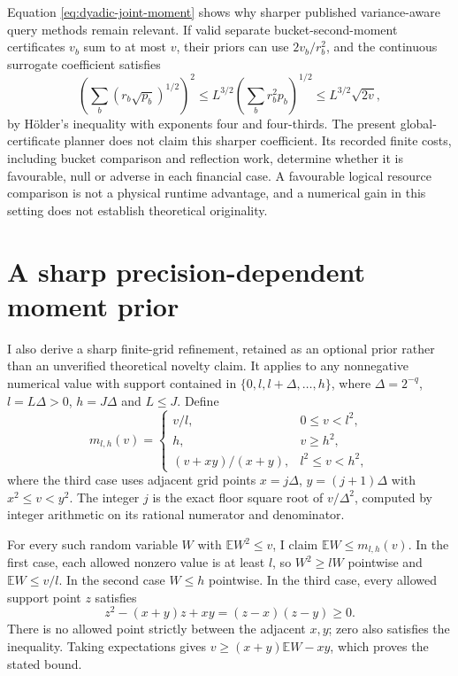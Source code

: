 Equation \eqref{eq:dyadic-joint-moment} shows why sharper published variance-aware query methods remain relevant. If valid separate bucket-second-moment certificates \(v_b\) sum to at most \(v\), their priors can use \(2v_b/r_b^2\), and the continuous surrogate coefficient satisfies
\[
 \left(\sum_b(r_b\sqrt{p_b})^{1/2}\right)^2
 \leq L^{3/2}\left(\sum_b r_b^2p_b\right)^{1/2}
 \leq L^{3/2}\sqrt{2v},
\]
by H\"older's inequality with exponents four and four-thirds. The present global-certificate planner does not claim this sharper coefficient. Its recorded finite costs, including bucket comparison and reflection work, determine whether it is favourable, null or adverse in each financial case. A favourable logical resource comparison is not a physical runtime advantage, and a numerical gain in this setting does not establish theoretical originality.

\section{A sharp precision-dependent moment prior}
\label{sec:dyadic-sharp-prior}

I also derive a sharp finite-grid refinement, retained as an optional prior rather than an unverified theoretical novelty claim. It applies to any nonnegative numerical value with support contained in
\(\{0,l,l+\Delta,\ldots,h\}\), where \(\Delta=2^{-q}\), \(l=L\Delta>0\), \(h=J\Delta\) and \(L\leq J\). Define
\[
 m_{l,h}(v)=
 \begin{cases}
  v/l,&0\leq v<l^2,\\
  h,&v\geq h^2,\\
  (v+xy)/(x+y),&l^2\leq v<h^2,
 \end{cases}
 \tag{D8}\label{eq:sharp-grid-prior}
\]
where the third case uses adjacent grid points \(x=j\Delta\), \(y=(j+1)\Delta\) with \(x^2\leq v<y^2\). The integer \(j\) is the exact floor square root of \(v/\Delta^2\), computed by integer arithmetic on its rational numerator and denominator.

For every such random variable \(W\) with \(\mathbb EW^2\leq v\), I claim
\(\mathbb EW\leq m_{l,h}(v)\). In the first case, each allowed nonzero value is at least \(l\), so \(W^2\geq lW\) pointwise and \(\mathbb EW\leq v/l\). In the second case \(W\leq h\) pointwise. In the third case, every allowed support point \(z\) satisfies
\[
 z^2-(x+y)z+xy=(z-x)(z-y)\geq0.
\]
There is no allowed point strictly between the adjacent \(x,y\); zero also satisfies the inequality. Taking expectations gives
\(v\geq(x+y)\mathbb EW-xy\), which proves the stated bound.

